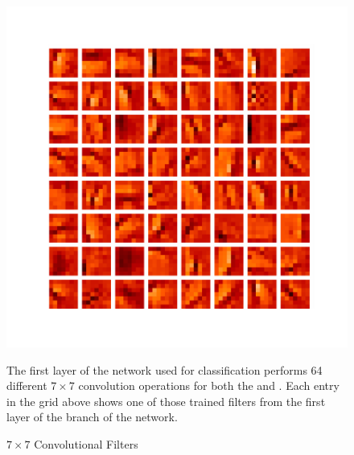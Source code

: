 \begin{figure}
\includegraphics[width=\textwidth]{figures/cnn/conv1y.pdf}
\caption{$7\times7$ Convolutional Filters}{
The first layer of the network used for classification performs 64 different
$7\times7$ convolution operations for both the \xview and \yview.
Each entry in the grid above shows one of those trained filters from the
first layer of the \yview branch of the network.
}
\label{7x7conv}
\end{figure}

